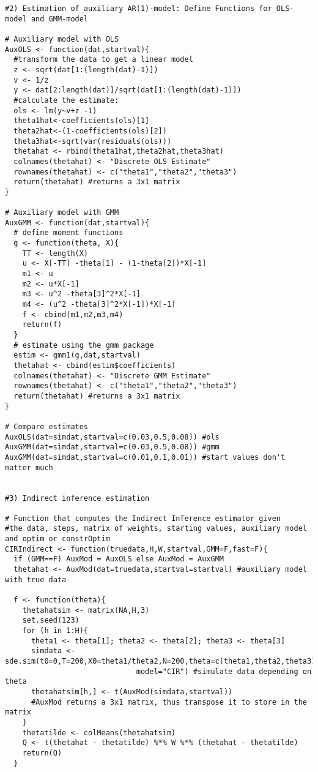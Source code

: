 \documentclass{article}
\begin{document}
\begin{solution}
\begin{verbatim}
#2) Estimation of auxiliary AR(1)-model: Define Functions for OLS-model and GMM-model

# Auxiliary model with OLS
AuxOLS <- function(dat,startval){
  #transform the data to get a linear model
  z <- sqrt(dat[1:(length(dat)-1)])
  v <- 1/z
  y <- dat[2:length(dat)]/sqrt(dat[1:(length(dat)-1)])
  #calculate the estimate:
  ols <- lm(y~v+z -1)
  theta1hat<-coefficients(ols)[1]
  theta2hat<-(1-coefficients(ols)[2])
  theta3hat<-sqrt(var(residuals(ols)))
  thetahat <- rbind(theta1hat,theta2hat,theta3hat)
  colnames(thetahat) <- "Discrete OLS Estimate"
  rownames(thetahat) <- c("theta1","theta2","theta3")
  return(thetahat) #returns a 3x1 matrix
}

# Auxiliary model with GMM
AuxGMM <- function(dat,startval){
  # define moment functions
  g <- function(theta, X){
    TT <- length(X)
    u <- X[-TT] -theta[1] - (1-theta[2])*X[-1]
    m1 <- u
    m2 <- u*X[-1]
    m3 <- u^2 -theta[3]^2*X[-1]
    m4 <- (u^2 -theta[3]^2*X[-1])*X[-1]
    f <- cbind(m1,m2,m3,m4)
    return(f)
  }
  # estimate using the gmm package
  estim <- gmm1(g,dat,startval)
  thetahat <- cbind(estim$coefficients)
  colnames(thetahat) <- "Discrete GMM Estimate"
  rownames(thetahat) <- c("theta1","theta2","theta3")
  return(thetahat) #returns a 3x1 matrix
}

# Compare estimates
AuxOLS(dat=simdat,startval=c(0.03,0.5,0.08)) #ols
AuxGMM(dat=simdat,startval=c(0.03,0.5,0.08)) #gmm
AuxGMM(dat=simdat,startval=c(0.01,0.1,0.01)) #start values don't matter much


#3) Indirect inference estimation

# Function that computes the Indirect Inference estimator given
#the data, steps, matrix of weights, starting values, auxiliary model and optim or constrOptim
CIRIndirect <- function(truedata,H,W,startval,GMM=F,fast=F){
  if (GMM==F) AuxMod = AuxOLS else AuxMod = AuxGMM
  thetahat <- AuxMod(dat=truedata,startval=startval) #auxiliary model with true data

  f <- function(theta){
    thetahatsim <- matrix(NA,H,3)
    set.seed(123)
    for (h in 1:H){
      theta1 <- theta[1]; theta2 <- theta[2]; theta3 <- theta[3]
      simdata <- sde.sim(t0=0,T=200,X0=theta1/theta2,N=200,theta=c(theta1,theta2,theta3),
                              model="CIR") #simulate data depending on theta
      thetahatsim[h,] <- t(AuxMod(simdata,startval)) 
      #AuxMod returns a 3x1 matrix, thus transpose it to store in the matrix
    }
    thetatilde <- colMeans(thetahatsim)
    Q <- t(thetahat - thetatilde) %*% W %*% (thetahat - thetatilde)
    return(Q)
  }


\end{verbatim}
\end{solution}
\end{document}
